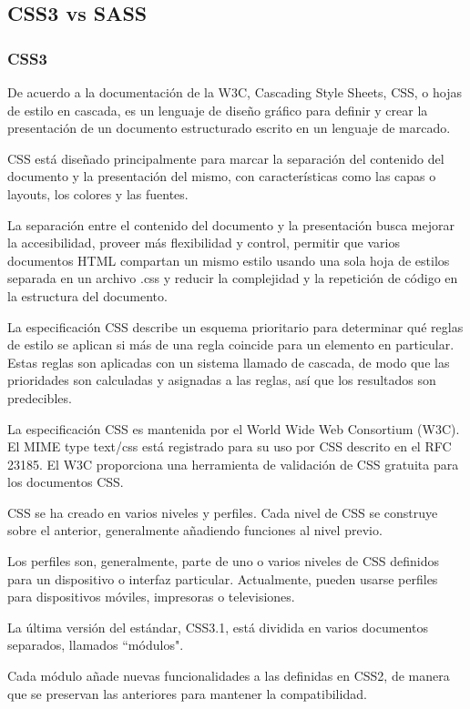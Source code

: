 \subsection{CSS3 vs SASS}
\subsubsection*{CSS3}
De acuerdo a la documentación de la W3C\cite{noauthor_what_nodate}, Cascading Style Sheets, CSS, o hojas de estilo en cascada, es un lenguaje de diseño gráfico para definir y crear la presentación de un documento estructurado escrito en un lenguaje de marcado.


CSS está diseñado principalmente para marcar la separación del contenido del documento y la presentación del mismo, con características como las capas o layouts, los colores y las fuentes.


La separación entre el contenido del documento y la presentación busca mejorar la accesibilidad, proveer más flexibilidad y control, permitir que varios documentos HTML compartan un mismo estilo usando una sola hoja de estilos separada en un archivo .css y reducir la complejidad y la repetición de código en la estructura del documento.


La especificación CSS describe un esquema prioritario para determinar qué reglas de estilo se aplican si más de una regla coincide para un elemento en particular. Estas reglas son aplicadas con un sistema llamado de cascada, de modo que las prioridades son calculadas y asignadas a las reglas, así que los resultados son predecibles.


La especificación CSS es mantenida por el World Wide Web Consortium (W3C). El MIME type text/css está registrado para su uso por CSS descrito en el RFC 23185​. El W3C proporciona una herramienta de validación de CSS gratuita para los documentos CSS.



CSS se ha creado en varios niveles y perfiles. Cada nivel de CSS se construye sobre el anterior, generalmente añadiendo funciones al nivel previo.


Los perfiles son, generalmente, parte de uno o varios niveles de CSS definidos para un dispositivo o interfaz particular. Actualmente, pueden usarse perfiles para dispositivos móviles, impresoras o televisiones.


La última versión del estándar, CSS3.1, está dividida en varios documentos separados, llamados ``módulos".


Cada módulo añade nuevas funcionalidades a las definidas en CSS2, de manera que se preservan las anteriores para mantener la compatibilidad.


